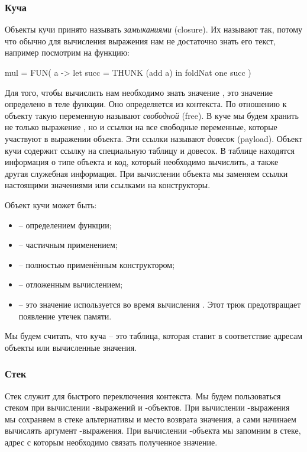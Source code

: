 \subsubsection{Куча}

Объекты кучи принято называть \emph{замыканиями} (closure).
Их называют так, потому что обычно для вычисления выражения
нам не достаточно знать его текст, например посмотрим на
функцию:

\begin{code}
mul     = FUN( a -> 
            let succ = THUNK (add a)
            in  foldNat one succ
          )
\end{code}

Для того, чтобы вычислить  нам необходимо
знать значение , это значение определено в теле функции.
Оно определяется из контекста. По отношению к объекту
такую переменную называют \emph{свободной} (free). 
В куче мы будем хранить не только выражение ,
но и ссылки на все свободные переменные, которые участвуют
в выражении объекта. Эти ссылки называют \emph{довесок} (payload).
Объект кучи содержит ссылку на специальную таблицу и довесок. 
В таблице находятся информация о типе объекта и 
код, который необходимо вычислить, а также другая 
служебная информация. При вычислении объекта мы заменяем
ссылки настоящими значениями или ссылками на конструкторы. 

Объект кучи может быть:

\begin{itemize}
\item {} -- определением функции;
\item {} -- частичным применением;
\item {} -- полностью применённым конструктором;
\item {} -- отложенным вычислением;
\item {} -- это значение используется во время вычисления
    . Этот трюк предотвращает появление утечек памяти. 
\end{itemize}

Мы будем считать, что куча -- это таблица, которая ставит 
в соответствие адресам объекты или вычисленные значения.


\subsubsection{Стек}

Стек служит для быстрого переключения контекста. Мы будем пользоваться
стеком при вычислении -выражений и -объектов. 
При вычислении -выражения мы сохраняем в стеке альтернативы
и место возврата значения, а сами начинаем вычислять аргумент
-выражения. При вычислении -объекта мы запомним
в стеке, адрес с которым необходимо связать полученное значение. 

